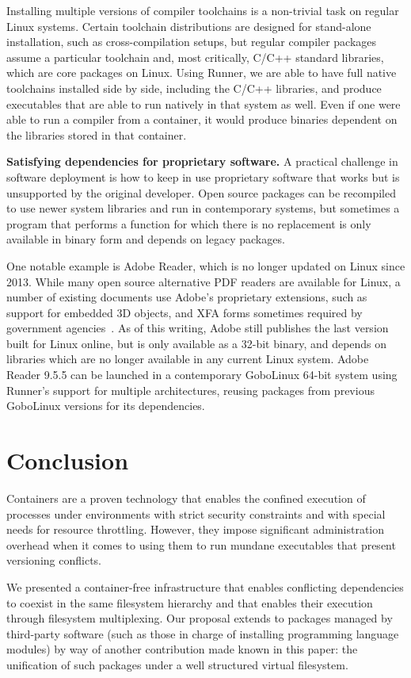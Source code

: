 \documentclass[sigplan, anonymous, 10pt]{acmart}
\begin{document}
Installing multiple versions of compiler toolchains is a non-trivial task on regular
Linux systems. Certain toolchain distributions are designed for stand-alone
installation, such as cross-compilation setups, but regular compiler packages
assume a particular toolchain and, most critically, C/C++ standard libraries, which
are core packages on Linux. Using Runner, we are able to have full native
toolchains installed side by side, including the C/C++ libraries, and produce
executables that are able to run natively in that system as well. Even if one
were able to run a compiler from a container, it would produce binaries dependent
on the libraries stored in that container.

\textbf{Satisfying dependencies for proprietary software.}
A practical challenge in software deployment is how to keep in use
proprietary software that works but is unsupported by the original developer.
Open source packages can be recompiled to use newer system libraries and
run in contemporary systems, but sometimes a program that performs
a function for which there is no replacement is only available in binary form
and depends on legacy packages.

One notable example is Adobe Reader, which is no longer updated on Linux since
2013. While many open source alternative PDF readers are available for Linux,
a number of existing documents use Adobe's proprietary extensions, such as
support for embedded 3D objects, and XFA forms sometimes required by
government agencies~\cite{grantsgov:adobe}. As of this writing, Adobe still publishes the last
version built for Linux online, but is only available as a 32-bit binary,
and depends on libraries which are no longer available in any current Linux
system. Adobe Reader 9.5.5 can be launched in a contemporary GoboLinux
64-bit system using Runner's support for multiple architectures,
reusing packages from previous GoboLinux versions for its dependencies.

\section{Conclusion}\label{sec:conclusion}
Containers are a proven technology that enables the confined execution of
processes under environments with strict security constraints and with special
needs for resource throttling. However, they impose significant administration
overhead when it comes to using them to run mundane executables that present
versioning conflicts.

We presented a container-free infrastructure that enables conflicting
dependencies to coexist in the same filesystem hierarchy and that enables
their execution through filesystem multiplexing. Our proposal extends to
packages managed by third-party software (such as those in charge of
installing programming language modules) by way of another contribution
made known in this paper: the unification of such packages under a well
structured virtual filesystem.
\end{document}
